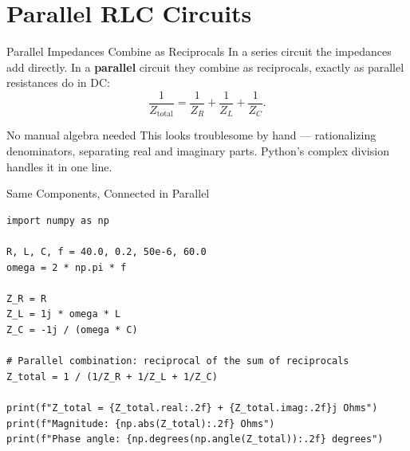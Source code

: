 \documentclass[9pt,aspectratio=169,xcolor=table]{beamer}
\begin{document}
\section{Parallel RLC Circuits}

\begin{frame}{Parallel Impedances Combine as Reciprocals}
    \leavevmode
    In a series circuit the impedances add directly. In a
    \textbf{parallel} circuit they combine as reciprocals, exactly as
    parallel resistances do in DC:
    \[
    \frac{1}{Z_{\text{total}}} = \frac{1}{Z_R} + \frac{1}{Z_L} + \frac{1}{Z_C}.
    \]

    \vspace{3mm}
    \begin{block}{No manual algebra needed}
        This looks troublesome by hand --- rationalizing denominators,
        separating real and imaginary parts. Python's complex division
        handles it in \alert{one line}.
    \end{block}
\end{frame}

\begin{frame}[fragile]{Same Components, Connected in Parallel}
    \leavevmode
\begin{lstlisting}
import numpy as np

R, L, C, f = 40.0, 0.2, 50e-6, 60.0
omega = 2 * np.pi * f

Z_R = R
Z_L = 1j * omega * L
Z_C = -1j / (omega * C)

# Parallel combination: reciprocal of the sum of reciprocals
Z_total = 1 / (1/Z_R + 1/Z_L + 1/Z_C)

print(f"Z_total = {Z_total.real:.2f} + {Z_total.imag:.2f}j Ohms")
print(f"Magnitude: {np.abs(Z_total):.2f} Ohms")
print(f"Phase angle: {np.degrees(np.angle(Z_total)):.2f} degrees")
\end{lstlisting}
\end{frame}
\end{document}
